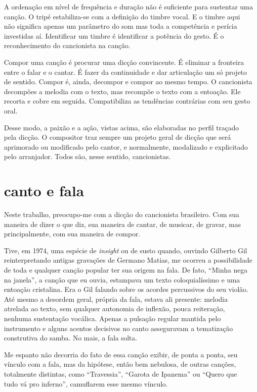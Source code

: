 A ordenação em nível de frequência e duração não é suficiente para
sustentar uma canção. O tripé estabiliza-se com a definição do timbre
vocal. E o timbre aqui não significa apenas um parâmetro do som mas toda
a competência e perícia investidas aí. Identificar um timbre é
identificar a potência do gesto. É o reconhecimento do cancionista na
canção.

Compor uma canção é procurar uma dicção convincente. É eliminar a
fronteira entre o falar e o cantar. É fazer da continuidade e dar
articulação um só projeto de sentido. Compor é, ainda, decompor e compor
ao mesmo tempo. O cancionista decompões a melodia com o texto, mas
recompõe o texto com a entoação. Ele recorta e cobre em seguida.
Compatibiliza as tendências contrárias com seu gesto oral.

Desse modo, a paixão e a ação, vistas acima, são elaboradas no perfil
traçado pela dicção. O compositor traz sempre um projeto geral de dicção
que será aprimorado ou modificado pelo cantor, e normalmente, modalizado
e explicitado pelo arranjador. Todos são, nesse sentido, cancionistas.

\section{canto e fala}

Neste trabalho, preocupo-me com a dicção do cancionista brasileiro. Com
sua maneira de dizer o que diz, sua maneira de cantar, de musicar, de
gravar, mas principalmente, com sua maneira de compor.

Tive, em 1974, uma espécie de \textit{insight} ou de susto quando, ouvindo
Gilberto Gil reinterpretando antigas gravações de Germano Matias, me
ocorreu a possibilidade de toda e qualquer canção popular ter sua origem
na fala. De fato, ``Minha nega na janela'', a canção que eu ouvia, estampava
um texto coloquialíssimo e uma entoação cristalina. Era o Gil falando
sobre os acordes percussivos do seu violão. Até mesmo a desordem geral,
própria da fala, estava ali presente: melodia atrelada ao texto, sem
qualquer autonomia de inflexão, pouca reiteração, nenhuma sustentação
vocálica. Apenas a pulsação regular mantida pelo instrumento e alguns
acentos decisivos no canto asseguravam a tematização construtiva do
samba. No mais, a fala solta.

Me espanto não decorria do fato de essa canção exibir, de ponta a ponta,
seu vínculo com a fala, mas da hipótese, então bem nebulosa, de outras
canções, totalmente distintas, como ``Travessia'', ``Garota de Ipanema'' ou
``Quero que tudo vá pro inferno'', camuflarem esse mesmo vínculo. 

